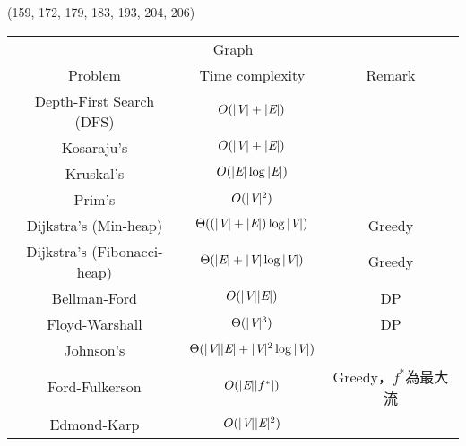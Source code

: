 \item \begin{theorem}{(159, 172, 179, 183, 193, 204, 206)} \quad\quad
    \begin{table}[H]
        \centering
        \begin{tabular}{|c|c|c|}
            \hline
            \multicolumn{3}{|c|}{Graph} \\
            \Xhline{3\arrayrulewidth}
            Problem & Time complexity & Remark \\
            \Xhline{2\arrayrulewidth}
            Depth-First Search (DFS) & $O(|\textit{V}| + |\textit{E}|)$ & \\
            \hline
            Kosaraju's & $O(|\textit{V}| + |\textit{E}|)$ & \\
            \hline
            Kruskal's & $O(|\textit{E}|\log |\textit{E}|)$ & \\
            \hline
            Prim's & $O(|\textit{V}|^2)$ & \\
            \hline
            Dijkstra's (Min-heap) & $\Theta((|\textit{V}| + |\textit{E}|)\log |\textit{V}|)$ & Greedy \\
            \hline
            Dijkstra's (Fibonacci-heap) & $\Theta(|\textit{E}| + |\textit{V}|\log|\textit{V}|)$ & Greedy \\
            \hline
            Bellman-Ford & $O(|\textit{V}||\textit{E}|)$ & DP \\
            \hline
            Floyd-Warshall & $\Theta(|\textit{V}|^3)$ & DP \\
            \hline
            Johnson's & $\Theta(|\textit{V}||\textit{E}| + |\textit{V}|^2\log |\textit{V}|)$ & \\
            \hline
            Ford-Fulkerson & $O(|\textit{E}||f^*|)$ & Greedy，$f^*$為最大流 \\
            \hline
            Edmond-Karp & $O(|\textit{V}||\textit{E}|^2)$ & \\
            \hline
        \end{tabular}
    \end{table}
\end{theorem}

